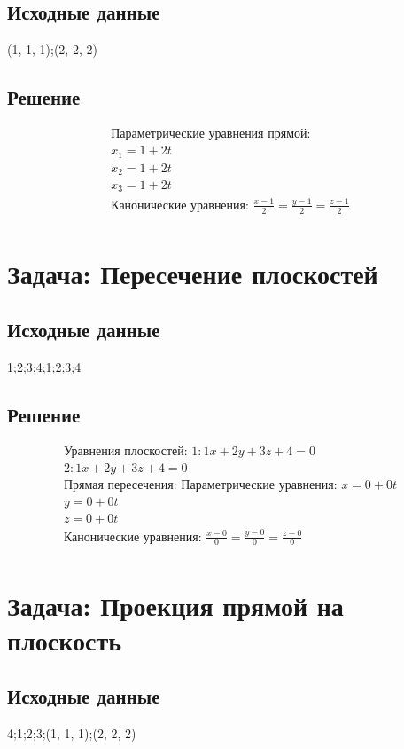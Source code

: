 \documentclass{article}
\begin{document}
\subsection{Исходные данные}
(1, 1, 1);(2, 2, 2)
\subsection{Решение}
\begin{align*}
\text{Параметрические уравнения прямой: }\\
x_1 = 1 + 2t\\
x_2 = 1 + 2t\\
x_3 = 1 + 2t\\
\text{Канонические уравнения: }
\frac{x - 1}{2} = \frac{y - 1}{2} = \frac{z - 1}{2}\\
\end{align*}
\section{Задача: Пересечение плоскостей}
\subsection{Исходные данные}
1;2;3;4;1;2;3;4
\subsection{Решение}
\begin{align*}
\text{Уравнения плоскостей: }
1: 1x + 2y + 3z + 4 = 0\\
2: 1x + 2y + 3z + 4 = 0\\
\text{Прямая пересечения: }
\text{Параметрические уравнения: }
x = 0 + 0t\\
y = 0 + 0t\\
z = 0 + 0t\\
\text{Канонические уравнения: }
\frac{x - 0}{0} = \frac{y - 0}{0} = \frac{z - 0}{0}\\
\end{align*}
\section{Задача: Проекция прямой на плоскость}
\subsection{Исходные данные}
4;1;2;3;(1, 1, 1);(2, 2, 2)
\end{document}

